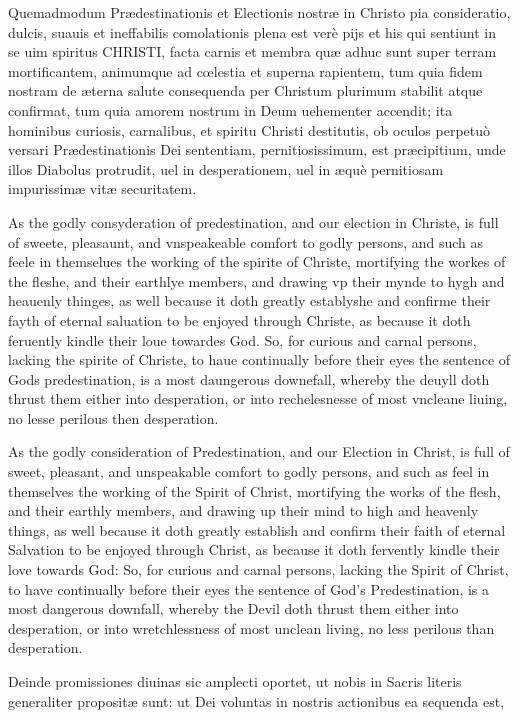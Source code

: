 Quemadmodum Prædestinationis et Electionis nostræ in Christo pia consideratio, dulcis, suauis et ineffabilis comolationis plena est verè pijs et his qui sentiunt in se uim spiritus CHRISTI, facta carnis et membra quæ adhuc sunt super terram mortificantem, animumque ad cœlestia et superna rapientem, tum quia fidem nostram de æterna salute consequenda per Christum plurimum stabilit atque confirmat, tum quia amorem nostrum in Deum uehementer accendit; ita hominibus curiosis, carnalibus, et spiritu Christi destitutis, ob oculos perpetuò versari Prædestinationis Dei sententiam, pernitiosissimum, est præcipitium, unde illos Diabolus protrudit, uel in desperationem, uel in æquè pernitiosam impurissimæ vitæ securitatem.

As the godly consyderation of predestination, and our election in Christe, is full of sweete, pleasaunt, and vnspeakeable comfort to godly persons, and such as feele in themselues the working of the spirite of Christe, mortifying the workes of the fleshe, and their earthlye members, and drawing vp their mynde to hygh and heauenly thinges, as well because it doth greatly establyshe and confirme their fayth of eternal saluation to be enjoyed through Christe, as because it doth feruently kindle their loue towardes God. So, for curious and carnal persons, lacking the spirite of Christe, to haue continually before their eyes the sentence of Gods predestination, is a most daungerous downefall, whereby the deuyll doth thrust them either into desperation, or into rechelesnesse of most vncleane liuing, no lesse perilous then desperation.

As the godly consideration of Predestination, and our Election in Christ, is full of sweet, pleasant, and unspeakable comfort to godly persons, and such as feel in themselves the working of the Spirit of Christ, mortifying the works of the flesh, and their earthly members, and drawing up their mind to high and heavenly things, as well because it doth greatly establish and confirm their faith of eternal Salvation to be enjoyed through Christ, as because it doth fervently kindle their love towards God: So, for curious and carnal persons, lacking the Spirit of Christ, to have continually before their eyes the sentence of God's Predestination, is a most dangerous downfall, whereby the Devil doth thrust them either into desperation, or into wretchlessness of most unclean living, no less perilous than desperation.

Deinde promissiones diuinas sic amplecti oportet, ut nobis in Sacris literis generaliter propositæ sunt: ut Dei voluntas in nostris actionibus ea sequenda est,

